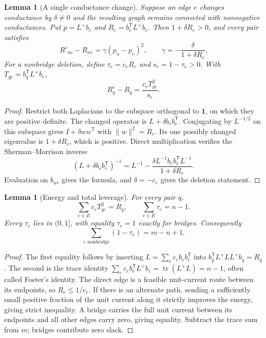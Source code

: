 \documentclass[11pt,letterpaper]{article}
\newtheorem{lemma}[theorem]{Lemma}
\newcommand{\one}{\mathbf 1}
\DeclareMathOperator{\tr}{tr}
\begin{document}
\begin{lemma}[A single conductance change]\label{lem:update}
Suppose an edge $e$ changes conductance by $\delta\ne0$ and the resulting graph remains connected with nonnegative conductances. Put $p=L^+b_e$ and $R_e=b_e^{\mathsf T}L^+b_e$. Then $1+\delta R_e>0$, and every pair satisfies
\[
 R'_{uv}-R_{uv}=\gamma(p_u-p_v)^2,
 \qquad \gamma=-\frac{\delta}{1+\delta R_e}.
\]
For a nonbridge deletion, define $\tau_e=c_eR_e$ and $s_e=1-\tau_e>0$. With $T_{qe}=b_q^{\mathsf T}L^+b_e$,
\[
 R_q^e-R_q=\frac{c_eT_{qe}^2}{s_e}.
\]
\end{lemma}
\begin{proof}
Restrict both Laplacians to the subspace orthogonal to $\one$, on which they are positive definite. The changed operator is $L+\delta b_eb_e^{\mathsf T}$. Conjugating by $L^{-1/2}$ on this subspace gives $I+\delta ww^{\mathsf T}$ with $\|w\|^2=R_e$. Its one possibly changed eigenvalue is $1+\delta R_e$, which is positive. Direct multiplication verifies the Sherman--Morrison inverse
\[
 (L+\delta b_eb_e^{\mathsf T})^{-1}
 =L^{-1}-\frac{\delta L^{-1}b_eb_e^{\mathsf T}L^{-1}}{1+\delta R_e}.
\]
Evaluation on $b_{uv}$ gives the formula, and $\delta=-c_e$ gives the deletion statement.
\end{proof}

\begin{lemma}[Energy and total leverage]\label{lem:energy}
For every pair $q$,
\[
 \sum_{e\in E}c_eT_{qe}^2=R_q,
 \qquad \sum_{e\in E}\tau_e=n-1.
\]
Every $\tau_e$ lies in $(0,1]$, with equality $\tau_e=1$ exactly for bridges. Consequently
\[
 \sum_{e\text{ nonbridge}}(1-\tau_e)=m-n+1.
\]
\end{lemma}
\begin{proof}
The first equality follows by inserting $L=\sum_e c_eb_eb_e^{\mathsf T}$ into $b_q^{\mathsf T}L^+LL^+b_q=R_q$. The second is the trace identity $\sum_e c_eb_e^{\mathsf T}L^+b_e=\tr(L^+L)=n-1$, often called Foster's identity. The direct edge is a feasible unit-current route between its endpoints, so $R_e\le1/c_e$. If there is an alternate path, sending a sufficiently small positive fraction of the unit current along it strictly improves the energy, giving strict inequality. A bridge carries the full unit current between its endpoints and all other edges carry zero, giving equality. Subtract the trace sum from $m$; bridges contribute zero slack.
\end{proof}
\end{document}
